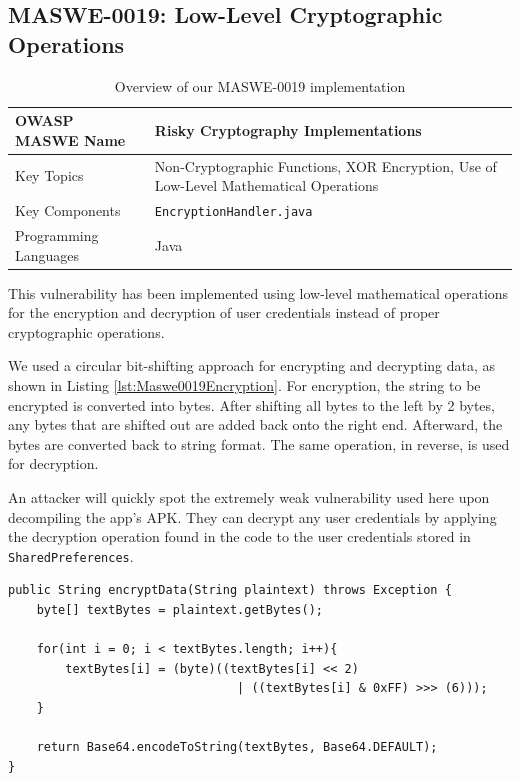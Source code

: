 \subsection{MASWE-0019: Low-Level Cryptographic Operations}

\begin{table}[H]
\centering
\renewcommand{\arraystretch}{1.3}
\begin{tabular}{p{5cm} p{8cm}} 
\toprule
OWASP MASWE Name & Risky Cryptography Implementations \\ 
\midrule
Key Topics & Non-Cryptographic Functions, XOR Encryption, Use of Low-Level Mathematical Operations \\
Key Components & \texttt{EncryptionHandler.java} \\
Programming Languages & Java \\ 
\bottomrule
\end{tabular}
\caption{Overview of our MASWE-0019 implementation}
\label{tab:maswe-0019}
\end{table}

This vulnerability has been implemented using low-level mathematical operations for the encryption and decryption of user credentials instead of proper cryptographic operations.

We used a circular bit-shifting approach for encrypting and decrypting data, as shown in Listing \ref{lst:Maswe0019Encryption}. For encryption, the string to be encrypted is converted into bytes. After shifting all bytes to the left by 2 bytes, any bytes that are shifted out are added back onto the right end. Afterward, the bytes are converted back to string format. The same operation, in reverse, is used for decryption. 

An attacker will quickly spot the extremely weak vulnerability used here upon decompiling the app's APK. They can decrypt any user credentials by applying the decryption operation found in the code to the user credentials stored in \texttt{SharedPreferences}.

\begin{lstlisting}[style=JavaStyle, float=tbh, captionpos=b, caption={Circular byte-shifting for low-level encryption of user data}, label=lst:Maswe0019Encryption]
public String encryptData(String plaintext) throws Exception {
    byte[] textBytes = plaintext.getBytes();

    for(int i = 0; i < textBytes.length; i++){
        textBytes[i] = (byte)((textBytes[i] << 2) 
                                | ((textBytes[i] & 0xFF) >>> (6)));
    }

    return Base64.encodeToString(textBytes, Base64.DEFAULT);
}
\end{lstlisting}


